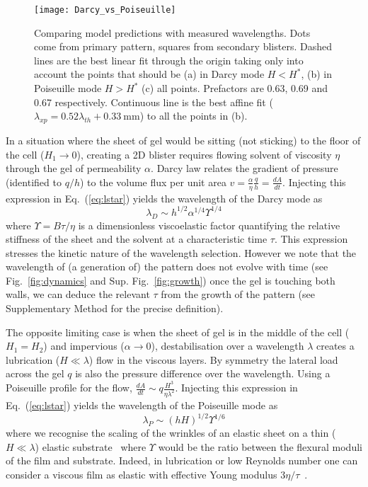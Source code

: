 \documentclass[twocolumn,superscriptaddress,showpacs,preprintnumbers,
amsmath,amssymb,prl]{revtex4-1}
\begin{document}
\begin{figure*}
	\texttt{[image: Darcy\_vs\_Poiseuille]}
	\caption{Comparing model predictions with measured wavelengths. Dots come from primary pattern, squares from secondary blisters. Dashed lines are the best linear fit through the origin taking only into account the points that should be (a) in Darcy mode $H<H^*$, (b) in Poiseuille mode $H>H^*$ (c) all points. Prefactors are 0.63, 0.69 and 0.67 respectively. Continuous line is the best affine fit ($\lambda_{xp}=0.52\lambda_{th}+\SI{0.33}{\milli\metre}$) to all the points in (b).}
	\label{fig:DarcyPoiseuille}
\end{figure*}

In a situation where the sheet of gel would be sitting (not sticking) to the floor of the cell ($H_1\rightarrow0$), creating a 2D blister requires flowing solvent of viscosity $\eta$ through the gel of permeability $\alpha$. Darcy law relates the gradient of pressure (identified to $q/h$) to the volume flux per unit area $v = \frac{\alpha}{\eta}\frac{q}{h} = \frac{dA}{dt}$. Injecting this expression in Eq.~(\ref{eq:lstar}) yields the wavelength of the Darcy mode as
\begin{equation}
\lambda_D \sim h^{1/2} \alpha^{1/4} \Upsilon^{1/4}
\end{equation}
where $\Upsilon = B\tau/\eta$ is a dimensionless viscoelastic factor quantifying the relative stiffness of the sheet and the solvent at a characteristic time $\tau$. This expression stresses the kinetic nature of the wavelength selection. However we note that the wavelength of (a generation of) the pattern does not evolve with time (see Fig.~\ref{fig:dynamics} and Sup. Fig.~\ref{fig:growth}) once the gel is touching both walls, we can deduce the relevant $\tau$ from the growth of the  pattern (see Supplementary Method for the precise definition).

The opposite limiting case is when the sheet of gel is in the middle of the cell ($H_1=H_2$) and impervious ($\alpha\rightarrow 0$), destabilisation over a wavelength $\lambda$ creates a lubrication ($H\ll\lambda$) flow in the viscous layers. By symmetry the lateral load across the gel $q$ is also the pressure difference over the wavelength. Using a Poiseuille profile for the flow, $\frac{dA}{dt} \sim q \frac{H^3}{\eta\lambda^2}$. Injecting this expression in Eq.~(\ref{eq:lstar}) yields the wavelength of the Poiseuille mode as
\begin{equation}
\lambda_P \sim (hH)^{1/2} \Upsilon^{1/6}
\end{equation}
where we recognise the scaling of the wrinkles of an elastic sheet on a thin ($H\ll\lambda$) elastic substrate~\cite{Cerda2003} where $\Upsilon$ would be the ratio between the flexural moduli of the film and substrate. Indeed, in lubrication or low Reynolds number one can consider a viscous film as elastic with effective Young modulus $3\eta/\tau$~\cite{Biot1957,Boudaoud2001}.
\end{document}
